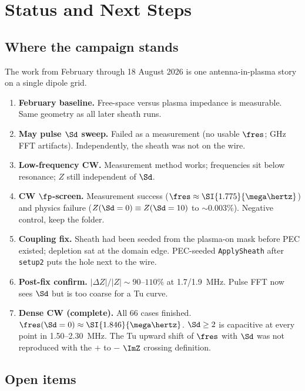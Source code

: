 \chapter{Status and Next Steps}
\label{ch:status}

\section{Where the campaign stands}

The work from February through 18 August 2026 is one antenna-in-plasma story on a single dipole grid.

\begin{enumerate}[leftmargin=1.5em]
\item \textbf{February baseline.} Free-space versus plasma impedance is measurable. Same geometry as all later sheath runs.
\item \textbf{May pulse \(\Sd\) sweep.} Failed as a measurement (no usable \(\fres\); GHz FFT artifacts). Independently, the sheath was not on the wire.
\item \textbf{Low-frequency CW.} Measurement method works; frequencies sit below resonance; \(Z\) still independent of \(\Sd\).
\item \textbf{CW \(\fp\)-screen.} Measurement success (\(\fres\approx\SI{1.775}{\mega\hertz}\)) and physics failure (\(Z(\Sd=0)\equiv Z(\Sd=10)\) to \(\sim 0.003\%\)). Negative control, keep the folder.
\item \textbf{Coupling fix.} Sheath had been seeded from the plasma-on mask before PEC existed; depletion sat at the domain edge. PEC-seeded \texttt{ApplySheath} after \texttt{setup2} puts the hole next to the wire.
\item \textbf{Post-fix confirm.} \(\lvert\Delta Z\rvert/\lvert Z\rvert\sim 90\)--\(110\%\) at 1.7/1.9~MHz. Pulse FFT now sees \(\Sd\) but is too coarse for a Tu curve.
\item \textbf{Dense CW (complete).} All 66 cases finished. \(\fres(\Sd=0)\approx\SI{1.846}{\mega\hertz}\). \(\Sd\ge 2\) is capacitive at every point in 1.50--2.30~MHz. The Tu upward shift of \(\fres\) with \(\Sd\) was not reproduced with the \(+\) to \(-\) \(\ImZ\) crossing definition.
\end{enumerate}

\section{Open items}

